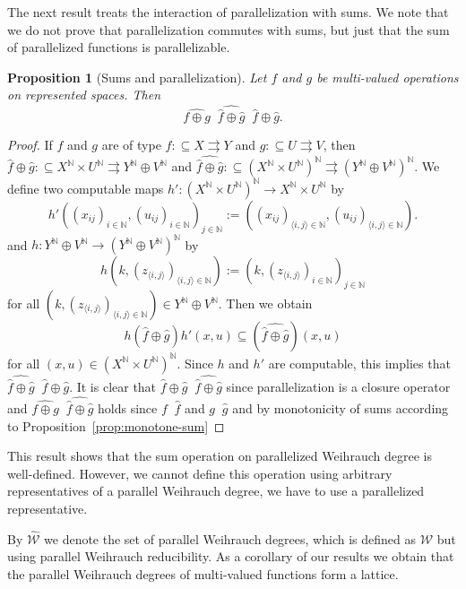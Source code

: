 \documentclass[jsl,10pt]{noasl}
\def\WW{{\mathcal W}}
\def\IN{{\mathbb{N}}}
\def\In{\subseteq}
\def\mto{\rightrightarrows}
\def\leqSW{\mathop{\leq_{\mathrm{sW}}}}
\def\equivSW{\mathop{\equiv_{\mathrm{sW}}}}
\newtheorem{proposition}{Proposition}[section]
\begin{document}
The next result treats the interaction of parallelization with sums.
We note that we do not prove that parallelization commutes with sums,
but just that the sum of parallelized functions is parallelizable.

\begin{proposition}[Sums and parallelization]
\label{prop:sum-parallelization}
Let $f$ and $g$ be multi-valued operations on represented spaces. Then
\[\widehat{f\oplus g}\leqSW\widehat{\widehat{f}\oplus\widehat{g}}\equivSW\widehat{f}\oplus\widehat{g}.\]
\end{proposition}
\begin{proof}
If $f$ and $g$ are of type $f:\In X\mto Y$ and $g:\In U\mto V$, then 
$\widehat{f}\oplus\widehat{g}:\In X^\IN\times U^\IN\mto Y^\IN\oplus V^\IN$ and
$\widehat{\widehat{f}\oplus\widehat{g}}:\In(X^\IN\times U^\IN)^\IN\mto(Y^\IN\oplus V^\IN)^\IN$.
We define two computable maps $h':(X^\IN\times U^\IN)^\IN\to X^\IN\times U^\IN$ by
\[h'((x_{ij})_{i\in\IN},(u_{ij})_{i\in\IN})_{j\in\IN}:=
  ((x_{ij})_{\langle i,j\rangle\in\IN},(u_{ij})_{\langle i,j\rangle\in\IN}).\]
and $h:Y^\IN\oplus V^\IN\to(Y^\IN\oplus V^\IN)^\IN$ by
\[h(k,(z_{\langle i,j\rangle})_{\langle i,j\rangle\in\IN}):=(k,(z_{\langle i,j\rangle})_{i\in\IN})_{j\in\IN}\]
for all $(k,(z_{\langle i,j\rangle})_{\langle i,j\rangle\in\IN})\in Y^\IN\oplus V^\IN$.
Then we obtain
\[h(\widehat{f}\oplus\widehat{g})h'(x,u)\In(\widehat{\widehat{f}\oplus\widehat{g}})(x,u)\]
for all $(x,u)\in(X^\IN\times U^\IN)^\IN$. Since $h$ and $h'$ are computable,
this implies that $\widehat{\widehat{f}\oplus\widehat{g}}\leqSW\widehat{f}\oplus\widehat{g}$.
It is clear that $\widehat{f}\oplus\widehat{g}\leqSW\widehat{\widehat{f}\oplus\widehat{g}}$
since parallelization is a closure operator and $\widehat{f\oplus g}\leqSW\widehat{\widehat{f}\oplus\widehat{g}}$
holds since $f\leqSW\widehat{f}$ and $g\leqSW\widehat{g}$ and by monotonicity of sums
according to Proposition~\ref{prop:monotone-sum}
\end{proof}

This result shows that the sum operation on parallelized Weihrauch degree
is well-defined. However, we cannot define this operation using arbitrary
representatives of a parallel Weihrauch degree, we have to use a parallelized
representative.

By $\widehat{\WW}$ we denote the set of parallel Weihrauch
degrees, which is defined as $\WW$ but using parallel Weihrauch reducibility.
As a corollary of our results we obtain that the parallel Weihrauch degrees 
of multi-valued functions form a lattice.
\end{document}
